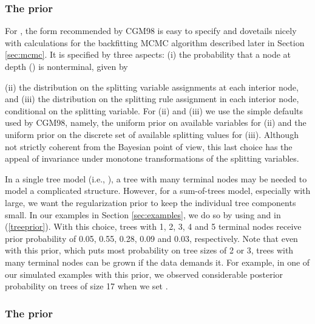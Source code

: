 \documentclass[aoas,nameyear,dvips]{arximspdf}
\begin{document}
\subsubsection{The  prior}\label{sec:treeprior}

For , the form recommended by CGM98 is easy to specify and
dovetails nicely with calculations for the backfitting MCMC
algorithm described later in Section \ref{sec:mcmc}.  It is
specified by three aspects: (i) the probability that a node at
depth  () is nonterminal, given by

(ii) the distribution on the splitting variable assignments at
each interior node, and (iii) the distribution on the splitting
rule assignment in each interior node, conditional on the splitting
variable. For (ii) and (iii) we use the simple defaults used by
CGM98, namely, the uniform prior on available variables for (ii)
and the uniform prior on the discrete set of available splitting
values for (iii).  Although not strictly coherent from the
Bayesian point of view, this last choice has the appeal of invariance
under monotone transformations of the splitting variables.

\iffalse
# R calculations for the prior on tree size when alpha=.95,beta=2...
pvec <- .95/(1:4)^2
p1 <- pvec[1]
p2 <- pvec[2]
p3 <- pvec[3]
p4 <- pvec[4]
# depth 1 is .05
# depth 2
p1*(1-p2)^2
# [1] 0.5523359
2*p1*p2*(1-p2)*(1-p3)^2
# [1] 0.2752731
4*p1*p2*p3*(1-p2)*(1-p3)*(1-p4)^2 + p1*p2*p2*(1-p3)^4
# [1] 0.09178265
# remainder
1-.05-0.5523359-0.2752731-0.09178265
# [1] 0.03060835
\fi

In a single tree model (i.e., ), a tree with many terminal
nodes may be needed to model a complicated structure.  However, for
a sum-of-trees model, especially with  large, we want the
regularization prior to keep the individual tree components small.
In our examples in Section \ref{sec:examples}, we do so by using
 and  in (\ref{treeprior}). With this choice,
trees with 1, 2, 3, 4 and 5 terminal nodes receive prior
probability of 0.05, 0.55, 0.28, 0.09 and 0.03, respectively.
Note that even with this prior, which puts most probability on
tree sizes of 2 or 3, trees with many terminal nodes can
be grown if the data demands it.  For example, in one of our
simulated examples with this prior, we observed considerable
posterior probability on trees of size 17 when we set .

\subsubsection{The  prior}\label{sec:mprior}
\end{document}

